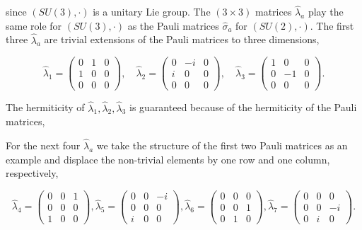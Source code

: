 \documentclass[10pt, letterpaper]{article}
\begin{document}
since $(S U(3), \cdot)$ is a unitary Lie group. The $(3 \times 3)$ matrices $\hat{\lambda}_{a}$ play the same role for $(S U(3), \cdot)$ as the Pauli matrices $\hat{\sigma}_{a}$ for $(S U(2), \cdot)$. The first three $\hat{\lambda}_{a}$ are trivial extensions of the Pauli matrices to three dimensions,

$$
\hat{\lambda}_{1}=\left(\begin{array}{lll}
0 & 1 & 0 \\
1 & 0 & 0 \\
0 & 0 & 0
\end{array}\right), \quad \hat{\lambda}_{2}=\left(\begin{array}{ccc}
0 & -i & 0 \\
i & 0 & 0 \\
0 & 0 & 0
\end{array}\right), \quad \hat{\lambda}_{3}=\left(\begin{array}{ccc}
1 & 0 & 0 \\
0 & -1 & 0 \\
0 & 0 & 0
\end{array}\right) .
$$

The hermiticity of $\hat{\lambda}_{1}, \hat{\lambda}_{2}, \hat{\lambda}_{3}$ is guaranteed because of the hermiticity of the Pauli matrices,

For the next four $\hat{\lambda}_{a}$ we take the structure of the first two Pauli matrices as an example and displace the non-trivial elements by one row and one column, respectively,

$$
\hat{\lambda}_{4}=\left(\begin{array}{lll}
0 & 0 & 1 \\
0 & 0 & 0 \\
1 & 0 & 0
\end{array}\right), \hat{\lambda}_{5}=\left(\begin{array}{ccc}
0 & 0 & -i \\
0 & 0 & 0 \\
i & 0 & 0
\end{array}\right), \hat{\lambda}_{6}=\left(\begin{array}{lll}
0 & 0 & 0 \\
0 & 0 & 1 \\
0 & 1 & 0
\end{array}\right), \hat{\lambda}_{7}=\left(\begin{array}{ccc}
0 & 0 & 0 \\
0 & 0 & -i \\
0 & i & 0
\end{array}\right) .
$$
\end{document}
